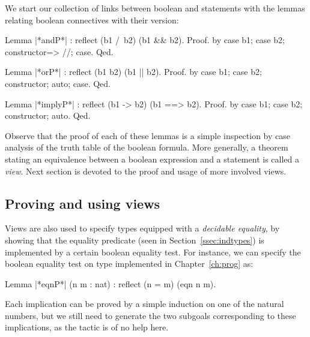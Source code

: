 
We start our collection of links between boolean and 
statements with the lemmas relating boolean connectives with their
 version:

\begin{coq}{}{}
Lemma |*andP*| : reflect (b1 /\ b2) (b1 && b2).
Proof. by case b1; case b2; constructor=> //; case. Qed.

Lemma |*orP*| : reflect (b1 \/ b2) (b1 || b2).
Proof. by case b1; case b2; constructor; auto; case. Qed.

Lemma |*implyP*| : reflect (b1 -> b2) (b1 ==> b2).
Proof. by case b1; case b2; constructor; auto. Qed.
\end{coq}

Observe that the proof of each of these lemmas is a simple inspection by
case analysis of the truth table of the boolean formula. More
generally, a theorem stating an equivalence between a boolean
expression and a  statement is called a \emph{view}. Next
section is devoted to the proof and usage of more involved views.

\subsection{Proving and using views}

Views are also used to specify types equipped with a
\emph{decidable equality}, by showing that the equality predicate
 (seen in Section~\ref{ssec:indtypes}) is implemented by a
certain boolean equality test. For instance, we can specify the
boolean equality test on type  implemented in
Chapter~\ref{ch:prog} as:

\begin{coq}{}{}
Lemma |*eqnP*| (n m : nat) : reflect (n = m) (eqn n m).
\end{coq}

Each implication can be proved by a simple induction on one of the
natural numbers, but we still need to generate the two subgoals
corresponding to these implications, as the  tactic is of no
help here.


